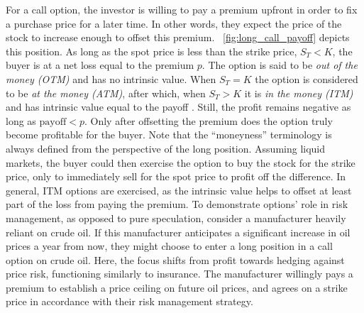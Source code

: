 \documentclass[english,12pt,a4paper,pdftex,sci,utf8]{aaltothesis}
\begin{document}
For a call option, the investor is willing to pay a premium upfront in order to fix a purchase price for a later time. In other words, they expect the price of the stock to increase enough to offset this premium. ~\cref{fig:long_call_payoff} depicts this position. As long as the spot price is less than the strike price, $S_T < K$, the buyer is at a net loss equal to the premium $p$. The option is said to be \emph{out of the money (OTM)} and has no intrinsic value. When $S_T = K$ the option is considered to be \emph{at the money (ATM)}, after which, when $S_T > K$ it is \emph{in the money (ITM)} and has intrinsic value equal to the payoff \cite{hull2013fundamentals}. Still, the profit remains negative as long as $\text{payoff} < p$. Only  after offsetting the premium does the option truly become profitable for the buyer. Note that the ``moneyness'' terminology is always defined from the perspective of the long position. Assuming liquid markets, the buyer could then exercise the option to buy the stock for the strike price, only to immediately sell for the spot price to profit off the difference. In general, ITM options are exercised, as the intrinsic value helps to offset at least part of the loss from paying the premium.\cite{hull2016options} To demonstrate options' role in risk management, as opposed to pure speculation, consider a manufacturer heavily reliant on crude oil. If this manufacturer anticipates a significant increase in oil prices a year from now, they might choose to enter a long position in a call option on crude oil. Here, the focus shifts from profit towards hedging against price risk, functioning similarly to insurance. The manufacturer willingly pays a premium to establish a price ceiling on future oil prices, and agrees on a strike price in accordance with their risk management strategy.
\end{document}

